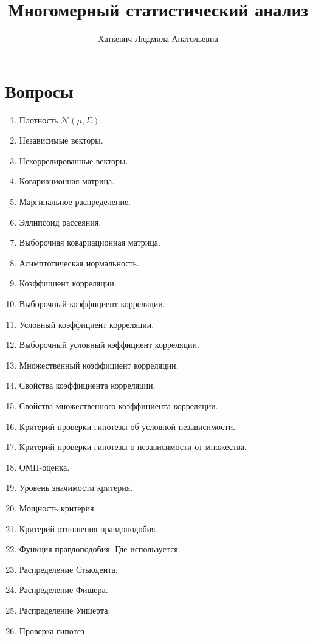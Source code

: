 \documentclass[a4paper]{article}
\title{Многомерный статистический анализ}
\author{Хаткевич Людмила Анатольевна}
\begin{document}
\maketitle

\section*{Вопросы}

\begin{enumerate}
	\item{Плотность $\mathcal{N}(\mu, \Sigma)$.}
	\item{Независимые векторы.}
	\item{Некоррелированные векторы.}
	\item{Ковариационная матрица.}
	\item{Маргинальное распределение.}
	\item{Эллипсоид рассеяния.}
	\item{Выборочная ковариационная матрица.}
	\item{Асимптотическая нормальность.}
	\item{Коэффициент корреляции.}
	\item{Выборочный коэффициент корреляции.}
	\item{Условный коэффициент корреляции.}
	\item{Выборочный условный кэффициент корреляции.}
	\item{Множественный коэффициент корреляции.}
	\item{Свойства коэффициента корреляции.}
	\item{Свойства множественного коэффициента корреляции.}
	\item{Критерий проверки гипотезы об условной независимости.}
	\item{Критерий проверки гипотезы о независимости от множества.}
	\item{ОМП-оценка.}
	\item{Уровень значимости критерия.}
	\item{Мощность критерия.}
	\item{Критерий отношения правдоподобия.}
	\item{Функция правдоподобия. Где используется.}
	\item{Распределение Стьюдента.}
	\item{Распределение Фишера.}
	\item{Распределение Уишерта.}
	\item{Проверка гипотез}
	\begin{enumerate}

\end{enumerate}
\end{enumerate}
\end{document}
